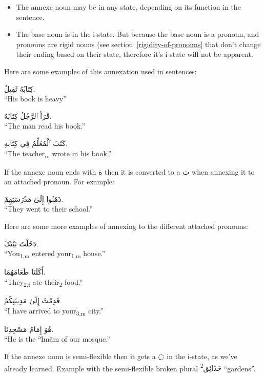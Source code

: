 \documentclass[
  10pt,
]{book}
\providecommand{\tightlist}{%
  \setlength{\itemsep}{0pt}\setlength{\parskip}{0pt}}
\begin{document}
\begin{itemize}
\tightlist
\item
  The annexe noun may be in any state, depending on its function in the sentence.
\item
  The base noun is in the i-state. But because the base noun is a pronoun, and pronouns are rigid nouns (see section~\ref{rigidity-of-pronouns} that don't change their ending based on their state, therefore it's i-state will not be apparent.
\end{itemize}

Here are some examples of this annexation used in sentences:

\foreignlanguage{arabic}{کِتَابُهُ ثَقِيلٌ.}\\
\enquote{His book is heavy}

\foreignlanguage{arabic}{قَرَأَ ٱلرَّجُلُ کِتَابَهُ.}\\
\enquote{The man read his book.}

\foreignlanguage{arabic}{کَتَبَ ٱلْمُعَلِّمُ فِي کِتَابهِ.}\\
\enquote{The teacher\textsubscript{m} wrote in his book.}

If the annexe noun ends with \foreignlanguage{arabic}{ة} then it is converted to a \foreignlanguage{arabic}{ت} when annexing it to an attached pronoun. For example:

\foreignlanguage{arabic}{ذَهَبُوا إِلَىٰ مَدْرَسَتِهِمْ.}\\
\enquote{They went to their school.}

Here are some more examples of annexing to the different attached pronouns:

\foreignlanguage{arabic}{دَخَلْتَ بَيْتَکَ.}\\
\enquote{You\textsubscript{1,m} entered your\textsubscript{1,m} house.}

\foreignlanguage{arabic}{أَکَلَتَا طَعَامَهُمَا.}\\
\enquote{They\textsubscript{2,f} ate their\textsubscript{2} food.}

\foreignlanguage{arabic}{قَدِمْتُ إِلَىٰ مَدِينَتِکُمْ}\\
\enquote{I have arrived to your\textsubscript{3,m} city.}

\foreignlanguage{arabic}{هُوَ إِمَامُ مَسْجِدِنَا.}\\
\enquote{He is the ʾImām of our mosque.}

If the annexe noun is semi-flexible then it gets a \foreignlanguage{arabic}{◌ِ} in the i-state, as we've already learned. Example with the semi-flexible broken plural \foreignlanguage{arabic}{حَدَائِق\textsuperscript{2}} \enquote{gardens}.
\end{document}
